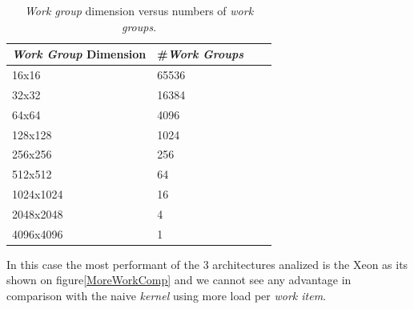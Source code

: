 \begin{table}[!h]
    \centering
    \begin{tabular}{| l | l | l | l |}
    \hline
    \emph{Work Group} Dimension & \#\emph{Work Groups} \\ \hline
    16x16 & 65536 \\ \hline
    32x32 & 16384 \\ \hline
    64x64 & 4096 \\ \hline
    128x128 & 1024 \\ \hline
    256x256 & 256 \\ \hline
    512x512 & 64 \\ \hline
    1024x1024 & 16 \\ \hline
    2048x2048 & 4 \\ \hline
    4096x4096 & 1 \\ 
    \hline
    \end{tabular}
    \caption{\emph{Work group} dimension versus numbers of \emph{work groups}.}
    \label{tab:work_groups}
\end{table}

\par{In this case the most performant of the 3 architectures analized is the Xeon as its shown on figure\ref{MoreWorkComp} and 
    we cannot see any advantage in comparison with the naive \emph{kernel} using more load per \emph{work item}.}


